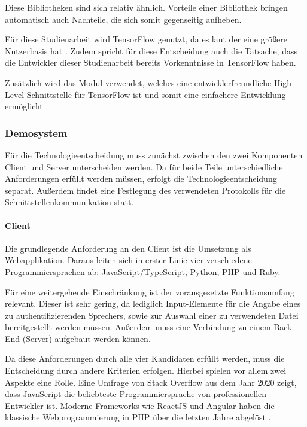 Diese Bibliotheken sind sich relativ ähnlich.
Vorteile einer Bibliothek bringen automatisch auch Nachteile, die sich somit gegenseitig aufheben.

Für diese Studienarbeit wird TensorFlow genutzt, da es laut der  eine größere Nutzerbasis hat \autocite[vgl.][]{stack_overflow_stack_2022}.
Zudem spricht für diese Entscheidung auch die Tatsache, dass die Entwickler dieser Studienarbeit bereits Vorkenntnisse in TensorFlow haben.

Zusätzlich wird das Modul  verwendet, welches eine entwicklerfreundliche High-Level-Schnittstelle für TensorFlow ist und somit eine einfachere Entwicklung ermöglicht \autocite[vgl.][]{noauthor_keras_2023}.

\textauthor{\vJB,}{\vLB}{}

\subsubsection{Demosystem}
Für die Technologieentscheidung muss zunächst zwischen den zwei Komponenten Client und Server unterscheiden werden.
Da für beide Teile unterschiedliche Anforderungen erfüllt werden müssen, erfolgt die Technologieentscheidung separat.
Außerdem findet eine Festlegung des verwendeten Protokolls für die Schnittstellenkommunikation statt.

\paragraph{Client}
Die grundlegende Anforderung an den Client ist die Umsetzung als Webapplikation.
Daraus leiten sich in erster Linie vier verschiedene Programmiersprachen ab: JavaScript/Type\-Script, Python, PHP und Ruby.

Für eine weitergehende Einschränkung ist der vorausgesetzte Funktionsumfang relevant.
Dieser ist sehr gering, da lediglich Input-Elemente für die Angabe eines zu authentifizierenden Sprechers, sowie zur Auswahl einer zu verwendeten Datei bereitgestellt werden müssen.
Außerdem muss eine Verbindung zu einem Back-End (Server) aufgebaut werden können.

Da diese Anforderungen durch alle vier Kandidaten erfüllt werden, muss die Entscheidung durch andere Kriterien erfolgen.
Hierbei spielen vor allem zwei Aspekte eine Rolle.
Eine Umfrage von Stack Overflow aus dem Jahr 2020 zeigt, dass JavaScript die beliebteste Programmiersprache von professionellen Entwickler ist.
Moderne Frameworks wie ReactJS und Angular haben die klassische Webprogrammierung in PHP über die letzten Jahre abgelöst \autocite[vgl.][]{stack_overflow_stack_2020}.

